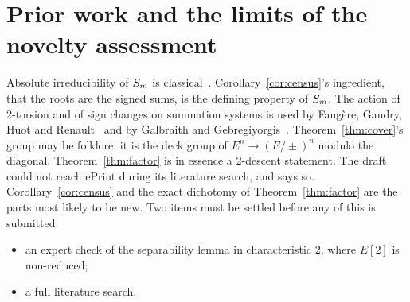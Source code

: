 \section{Prior work and the limits of the novelty assessment}\label{sec:cover-prior}

Absolute irreducibility of $S_{m}$ is classical~\cite{semaev2004,gaudry2009}.
Corollary~\ref{cor:census}'s ingredient, that the roots are the signed sums,
is the defining property of $S_{m}$. The action of 2-torsion and of sign
changes on summation systems is used by Faugère, Gaudry, Huot and
Renault~\cite{fghr2014} and by Galbraith and
Gebregiyorgis~\cite{galbraith2014}. Theorem~\ref{thm:cover}'s group may be
folklore: it is the deck group of $E^n\to(E/\pm)^n$ modulo the diagonal.
Theorem~\ref{thm:factor} is in essence a 2-descent statement. The draft
could not reach ePrint during its literature search, and says so.
Corollary~\ref{cor:census} and the exact dichotomy of
Theorem~\ref{thm:factor} are the parts most likely to be new. Two items
must be settled before any of this is submitted:
\begin{itemize}
\item an expert check of the separability lemma in characteristic 2,
  where $E[2]$ is non-reduced;
\item a full literature search.
\end{itemize}
